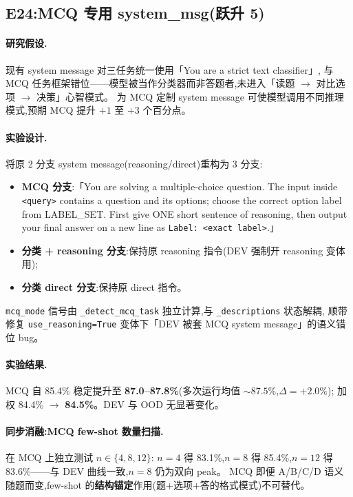 \documentclass[11pt,a4paper]{ctexart}
\begin{document}
\subsection{E24:MCQ 专用 system\_msg(跃升 5)}

\paragraph{研究假设.}现有 system message 对三任务统一使用「You are a strict text classifier」,
与 MCQ 任务框架错位——模型被当作分类器而非答题者,未进入「读题 $\to$ 对比选项 $\to$ 决策」心智模式。
为 MCQ 定制 system message 可使模型调用不同推理模式,预期 MCQ 提升 $+1$ 至 $+3$ 个百分点。

\paragraph{实验设计.}将原 2 分支 system message(reasoning/direct)重构为 3 分支:
\begin{itemize}[leftmargin=2em,itemsep=0.1em]
\item \textbf{MCQ 分支}:「You are solving a multiple-choice question. The input inside \texttt{<query>} contains
  a question and its options; choose the correct option label from LABEL\_SET. First give ONE short sentence
  of reasoning, then output your final answer on a new line as \texttt{Label: <exact label>}.」
\item \textbf{分类 + reasoning 分支}:保持原 reasoning 指令(DEV 强制开 reasoning 变体用);
\item \textbf{分类 direct 分支}:保持原 direct 指令。
\end{itemize}
\texttt{mcq\_mode} 信号由 \texttt{\_detect\_mcq\_task} 独立计算,与 \texttt{\_descriptions} 状态解耦,
顺带修复 \texttt{use\_reasoning=True} 变体下「DEV 被套 MCQ system message」的语义错位 bug。

\paragraph{实验结果.}MCQ 自 85.4\% 稳定提升至 \textbf{87.0--87.8\%}(多次运行均值 $\sim 87.5\%$,$\Delta = +2.0\%$);
加权 84.4\% $\to$ \textbf{84.5\%}。DEV 与 OOD 无显著变化。

\paragraph{同步消融:MCQ few-shot 数量扫描.}在 MCQ 上独立测试 $n \in \{4, 8, 12\}$:
$n=4$ 得 83.1\%,$n=8$ 得 85.4\%,$n=12$ 得 83.6\%——与 DEV 曲线一致,$n=8$ 仍为双向 peak。
MCQ 即便 A/B/C/D 语义随题而变,few-shot 的\textbf{结构锚定}作用(题+选项+答的格式模式)不可替代。
\end{document}
